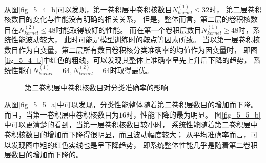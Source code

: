 从图\ref{fig_5_4_b}可以发现，第一卷积层中卷积核数目$N_{kernel}^{(1)} \leq 32$时，
第二层卷积核数目的变化与性能没有明确的相关关系，
但是，整体而言，第二层的卷积核数目在$N_{kernel}^{(2)} \leq 48$时能取得较好的性能。
而在第一个卷积层数目$N_{kernel}^{(1)} \geq 48$时，系统性能波动较大，
此时可能是模型训练时的鞍点等因素所致。
当以第一层卷积核数目作为自变量，第二层所有数目卷积核分类准确率的均值作为因变量时，
即图\ref{fig_5_4_b}中红色的粗线，可以发现其整体上准确率呈先上升后下降的趋势，
系统性能在$N_{kernel}^{(1)} = 64, N_{kernel}^{(2)} =64$时取得最优。
\par

\begin{figure}[!h]
	\centering
	\caption{第二卷积层中卷积核数目对分类准确率的影响}
	\label{fig_5_5}
\end{figure}
从图\ref{fig_5_5_a}中可以发现，分类性能整体随着第二卷积层数目的增加而下降。
而且，当第一卷积层中卷积核数目为$16$时，性能下降的最为明显。
图\ref{fig_5_5_b}中可以更清楚的看到，当第一层卷积核数目较小时，
系统性能随着第二卷积层中卷积核数目的增加而下降得很明显，而且波动幅度较大；
从平均准确率而言，可以发现图中粗的红色实线也是呈下降趋势，
即系统整体性能几乎是随着第二卷积层数目的增加而下降的。
\par
